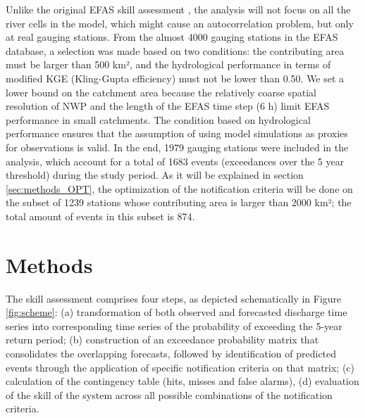 \documentclass[preprint,12pt,authoryear]{elsarticle}
\begin{document}
Unlike the original EFAS skill assessment \cite{Bartholmes2009}, the analysis will not focus on all the river cells in the model, which might cause an autocorrelation problem, but only at real gauging stations. From the almost 4000 gauging stations in the EFAS database, a selection was made based on two conditions: the contributing area must be larger than 500 km², and the hydrological performance in terms of modified KGE (Kling-Gupta efficiency) \cite{Gupta2009, Knoben2019} must not be lower than 0.50. We set a lower bound on the catchment area because the relatively coarse spatial resolution of NWP and the length of the EFAS time step (6 h) limit EFAS performance in small catchments. The condition based on hydrological performance ensures that the assumption of using model simulations as proxies for observations is valid. In the end, 1979 gauging stations were included in the analysis, which account for a total of 1683 events (exceedances over the 5 year threshold) during the study period. As it will be explained in section \ref{sec:methods_OPT}, the optimization of the notification criteria will be done on the subset of 1239 stations whose contributing area is larger than 2000 km²; the total amount of events in this subset is 874.

\section{Methods}
\label{sec:methods}

The skill assessment comprises four steps, as depicted schematically in Figure \ref{fig:scheme}: (a) transformation of both observed and forecasted discharge time series into corresponding time series of the probability of exceeding the 5-year return period; (b) construction of an exceedance probability matrix that consolidates the overlapping forecasts, followed by identification of predicted events through the application of specific notification criteria on that matrix; (c) calculation of the contingency table (hits, misses and false alarms), (d) evaluation of the skill of the system across all possible combinations of the notification criteria.
\end{document}

